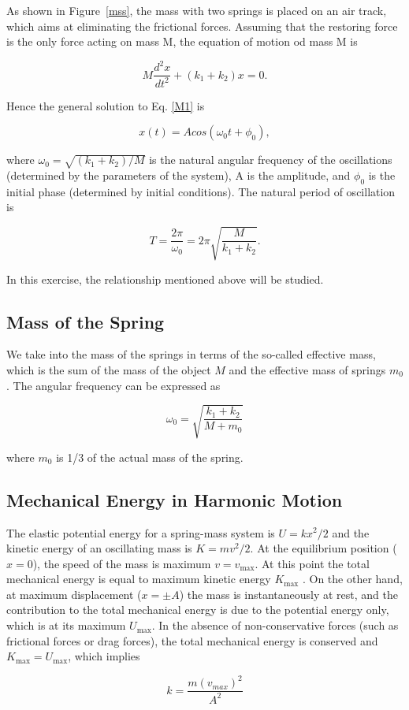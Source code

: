 As shown in Figure~\ref{mss}, the mass with two springs is placed on an
air track, which aims at eliminating the frictional forces. Assuming that the
restoring force is the only force acting on mass M, the equation of motion od
mass M is 

\begin{equation}
\label{M1}
M\frac{d^2x}{dt^2}+(k_1+k_2)x=0.
\end{equation}

Hence the general solution to Eq. \ref{M1} is

\begin{equation}
x(t)=Acos(\omega_0t+\phi_0),
\end{equation}

where $\omega_0=\sqrt{(k_1+k_2)/M}$ is the natural angular frequency of the
oscillations (determined by the parameters of the system), A is the amplitude,
and $\phi_0$ is the initial phase (determined by initial conditions). The
natural period of oscillation is 

\begin{equation}
T=\frac{2\pi}{\omega_0}=2\pi\sqrt{\frac{M}{k_1+k_2}}.
\end{equation}
    
In this exercise, the relationship mentioned above will be studied.
    
\subsection{Mass of the Spring}

We take into the mass of the springs in terms of the so-called
effective mass, which is the sum of the mass of the object $M$ and
the effective mass of springs $m_0$.
The angular frequency can be expressed as

\begin{equation}
  \label{omega1}
\omega_0=\sqrt{\frac{k_1+k_2}{M+m_0}}
\end{equation}

where $m_0$ is 1/3 of the actual mass of the spring.

\subsection{Mechanical Energy in Harmonic Motion}

The elastic potential energy for a spring-mass system is $U=kx^2/2$ and the
kinetic energy of an oscillating mass is $K=mv^2/2$.
At the equilibrium position ($x=0$), the speed of the mass is maximum
$v=v_{\max}$. 
At this point the total mechanical energy is equal to maximum kinetic energy
$K_{\max}$ . 
On the other hand, at maximum displacement ($x=\pm A$) the mass is
instantaneously at rest, and the contribution to the total mechanical energy is
due to the potential energy only, which is at its maximum $U_{\max}$. 
In the absence of non-conservative forces (such as frictional forces or drag
forces), the total mechanical energy is conserved and $K_{\max}=U_{\max}$, which
implies  

\begin{equation}
k=\frac{m (v_{max})^2}{A^2}
\end{equation}


